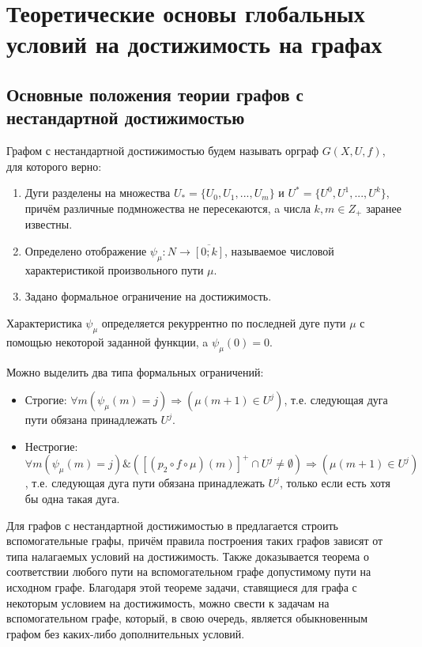 \chapter{Теоретические основы глобальных условий на достижимость на графах}

\section{Основные положения теории графов с нестандартной достижимостью}

\begin{definition}
	Графом с нестандартной достижимостью будем называть орграф $G(X,U,f)$, для которого верно:
	\begin{enumerate}
		\item Дуги разделены на множества $U_* = \{U_0, U_1, ... , U_m\}$ и $U^* = \{U^0, U^1, ... , U^k\}$, причём различные подмножества не пересекаются, a числа $k, m \in Z_+$ заранее известны.
		\item Определено отображение $\psi_\mu:N\to \overline{ [0; k] }$, называемое числовой характеристикой произвольного пути $\mu$.
		\item Задано формальное ограничение на достижимость.
	\end{enumerate}
\end{definition}

Характеристика $\psi_\mu$ определяется рекуррентно по последней дуге пути $\mu$ с помощью некоторой заданной функции, a $\psi_\mu(0) = 0$.

Можно выделить два типа формальных ограничений:
\begin{itemize}
	\item Строгие: $\forall m (\psi_\mu(m) = j) \Longrightarrow (\mu(m+1) \in U^j) $, т.е. следующая дуга пути обязана принадлежать $U^j$.
	\item Нестрогие: $\forall m (\psi_\mu(m) = j) \& ([(p_2 \circ f \circ \mu)(m)]^+ \cap U^j \neq \emptyset) \Longrightarrow (\mu(m+1) \in U^j) $, т.е. следующая дуга пути обязана принадлежать $U^j$, только если есть хотя бы одна такая дуга.
\end{itemize}

Для графов с нестандартной достижимостью в\cite{Mono} предлагается строить вспомогательные графы, причём правила построения таких графов зависят от типа налагаемых условий на достижимость. Также доказывается теорема о соответствии любого пути на вспомогательном графе допустимому пути на исходном графе. Благодаря этой теореме задачи, ставящиеся для графа с некоторым условием на достижимость, можно свести к задачам на вспомогательном графе, который, в свою очередь, является обыкновенным графом без каких-либо дополнительных условий. 

